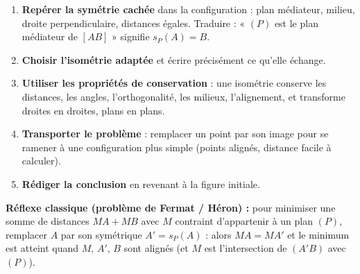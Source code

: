 \documentclass[11pt]{article}
\begin{document}
\begin{methode}
\begin{enumerate}
\item \textbf{Repérer la symétrie cachée} dans la configuration : plan médiateur, milieu, droite perpendiculaire, distances égales. Traduire : « $(P)$ est le plan médiateur de $[AB]$ » signifie $s_{P}(A)=B$.
\item \textbf{Choisir l'isométrie adaptée} et écrire précisément ce qu'elle échange.
\item \textbf{Utiliser les propriétés de conservation} : une isométrie conserve les distances, les angles, l'orthogonalité, les milieux, l'alignement, et transforme droites en droites, plans en plans.
\item \textbf{Transporter le problème} : remplacer un point par son image pour se ramener à une configuration plus simple (points alignés, distance facile à calculer).
\item \textbf{Rédiger la conclusion} en revenant à la figure initiale.
\end{enumerate}
\textbf{Réflexe classique (problème de Fermat / Héron) :} pour minimiser une somme de distances $MA+MB$ avec $M$ contraint d'appartenir à un plan $(P)$, remplacer $A$ par son symétrique $A'=s_{P}(A)$ : alors $MA=MA'$ et le minimum est atteint quand $M$, $A'$, $B$ sont alignés (et $M$ est l'intersection de $(A'B)$ avec $(P)$).
\end{methode}
\end{document}
